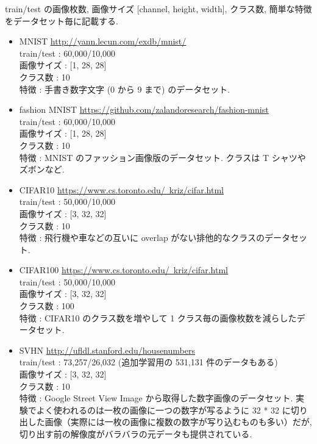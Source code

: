 train/test の画像枚数, 画像サイズ [channel, height, width], クラス数, 簡単な特徴をデータセット毎に記載する.
%
\begin{itemize}
  \item MNIST \href{http://yann.lecun.com/exdb/mnist/}{http://yann.lecun.com/exdb/mnist/}\\
  train/test : 60,000/10,000\\
  画像サイズ : [1, 28, 28]\\
  クラス数 : 10\\
  特徴 : 手書き数字文字 (0 から 9 まで) のデータセット.
  \item fashion MNIST \href{https://github.com/zalandoresearch/fashion-mnist}{https://github.com/zalandoresearch/fashion-mnist}\\
  train/test : 60,000/10,000\\
  画像サイズ : [1, 28, 28]\\
  クラス数 : 10\\
  特徴 : MNIST のファッション画像版のデータセット. クラスは T シャツやズボンなど.
  \item CIFAR10 \href{https://www.cs.toronto.edu/~kriz/cifar.html}{https://www.cs.toronto.edu/~kriz/cifar.html}\\
  train/test : 50,000/10,000\\
  画像サイズ : [3, 32, 32]\\
  クラス数 : 10\\
  特徴 : 飛行機や車などの互いに overlap がない排他的なクラスのデータセット.
  \item CIFAR100 \href{https://www.cs.toronto.edu/~kriz/cifar.html}{https://www.cs.toronto.edu/~kriz/cifar.html}\\
  train/test : 50,000/10,000\\
  画像サイズ : [3, 32, 32]\\
  クラス数 : 100\\
  特徴 : CIFAR10 のクラス数を増やして 1 クラス毎の画像枚数を減らしたデータセット.
  \item SVHN \href{http://ufldl.stanford.edu/housenumbers}{http://ufldl.stanford.edu/housenumbers}\\
  train/test : 73,257/26,032 (追加学習用の 531,131 件のデータもある)\\
  画像サイズ : [3, 32, 32]\\
  クラス数 : 10\\
  特徴 : Google Street View Image から取得した数字画像のデータセット. 実験でよく使われるのは一枚の画像に一つの数字が写るように 32 * 32 に切り出した画像（実際には一枚の画像に複数の数字が写り込むものも多い）だが, 切り出す前の解像度がバラバラの元データも提供されている.

\end{itemize}

